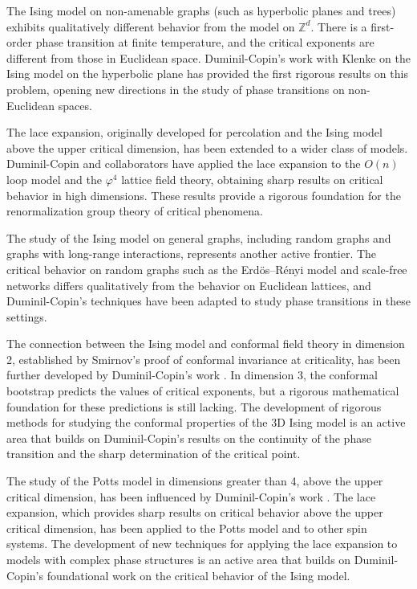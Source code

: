 The Ising model on non-amenable graphs (such as hyperbolic planes and trees) exhibits qualitatively different behavior from the model on $\mathbb{Z}^d$. There is a first-order phase transition at finite temperature, and the critical exponents are different from those in Euclidean space. Duminil-Copin's work \cite{duminilcopin2016} with Klenke on the Ising model on the hyperbolic plane has provided the first rigorous results on this problem, opening new directions in the study of phase transitions on non-Euclidean spaces.

The lace expansion, originally developed for percolation and the Ising model above the upper critical dimension, has been extended to a wider class of models. Duminil-Copin and collaborators have applied the lace expansion to the $O(n)$ loop model and the $\varphi^4$ lattice field theory, obtaining sharp results on critical behavior in high dimensions. These results provide a rigorous foundation for the renormalization group theory of critical phenomena.

The study of the Ising model on general graphs, including random graphs and graphs with long-range interactions, represents another active frontier. The critical behavior on random graphs such as the Erd\"{o}s--R\'{e}nyi model and scale-free networks differs qualitatively from the behavior on Euclidean lattices, and Duminil-Copin's techniques have been adapted to study phase transitions in these settings.

The connection between the Ising model and conformal field theory in dimension 2, established by Smirnov's proof of conformal invariance at criticality, has been further developed by Duminil-Copin's work \cite{duminilcopin2016}. In dimension 3, the conformal bootstrap predicts the values of critical exponents, but a rigorous mathematical foundation for these predictions is still lacking. The development of rigorous methods for studying the conformal properties of the 3D Ising model is an active area that builds on Duminil-Copin's results on the continuity of the phase transition and the sharp determination of the critical point.

The study of the Potts model in dimensions greater than 4, above the upper critical dimension, has been influenced by Duminil-Copin's work \cite{duminilcopin2016}. The lace expansion, which provides sharp results on critical behavior above the upper critical dimension, has been applied to the Potts model and to other spin systems. The development of new techniques for applying the lace expansion to models with complex phase structures is an active area that builds on Duminil-Copin's foundational work on the critical behavior of the Ising model.

